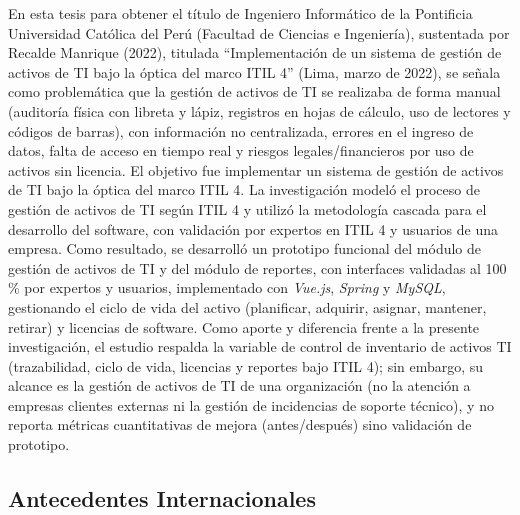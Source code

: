 En esta tesis para obtener el título de Ingeniero Informático de la Pontificia Universidad Católica del Perú (Facultad de Ciencias e Ingeniería), sustentada por Recalde Manrique (2022), titulada ``Implementación de un sistema de gestión de activos de TI bajo la óptica del marco ITIL 4'' (Lima, marzo de 2022), se señala como problemática que la gestión de activos de TI se realizaba de forma manual (auditoría física con libreta y lápiz, registros en hojas de cálculo, uso de lectores y códigos de barras), con información no centralizada, errores en el ingreso de datos, falta de acceso en tiempo real y riesgos legales/financieros por uso de activos sin licencia. El objetivo fue implementar un sistema de gestión de activos de TI bajo la óptica del marco ITIL 4. La investigación modeló el proceso de gestión de activos de TI según ITIL 4 y utilizó la metodología cascada para el desarrollo del software, con validación por expertos en ITIL 4 y usuarios de una empresa. Como resultado, se desarrolló un prototipo funcional del módulo de gestión de activos de TI y del módulo de reportes, con interfaces validadas al 100\,\% por expertos y usuarios, implementado con \textit{Vue.js}, \textit{Spring} y \textit{MySQL}, gestionando el ciclo de vida del activo (planificar, adquirir, asignar, mantener, retirar) y licencias de software. Como aporte y diferencia frente a la presente investigación, el estudio respalda la variable de control de inventario de activos TI (trazabilidad, ciclo de vida, licencias y reportes bajo ITIL 4); sin embargo, su alcance es la gestión de activos de TI de una organización (no la atención a empresas clientes externas ni la gestión de incidencias de soporte técnico), y no reporta métricas cuantitativas de mejora (antes/después) sino validación de prototipo.

\vspace{1.2em}

\subsection{Antecedentes Internacionales}

